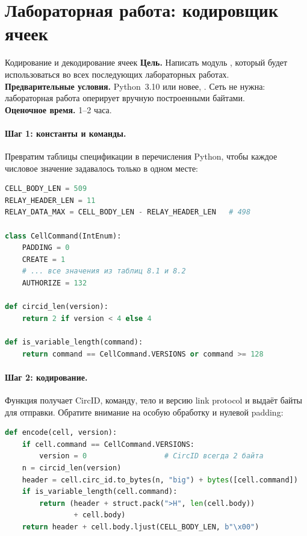 \section{Лабораторная работа: кодировщик ячеек}\label{sec:lab-celle}

\begin{laboratorio}[2]{Кодирование и декодирование ячеек}
\textbf{Цель.} Написать модуль , который будет использоваться во всех последующих лабораторных работах.\\
\textbf{Предварительные условия.} Python~3.10 или новее, . Сеть не нужна: лабораторная работа оперирует вручную построенными байтами.\\
\textbf{Оценочное время.} 1--2 часа.
\end{laboratorio}

\paragraph{Шаг 1: константы и команды.} Превратим таблицы спецификации в перечисления Python, чтобы каждое числовое значение задавалось только в одном месте:

\begin{lstlisting}[language=Python]
CELL_BODY_LEN = 509
RELAY_HEADER_LEN = 11
RELAY_DATA_MAX = CELL_BODY_LEN - RELAY_HEADER_LEN   # 498

class CellCommand(IntEnum):
    PADDING = 0
    CREATE = 1
    # ... все значения из таблиц 8.1 и 8.2
    AUTHORIZE = 132

def circid_len(version):
    return 2 if version < 4 else 4

def is_variable_length(command):
    return command == CellCommand.VERSIONS or command >= 128
\end{lstlisting}

\paragraph{Шаг 2: кодирование.} Функция получает CircID, команду, тело и версию link protocol и выдаёт байты для отправки. Обратите внимание на особую обработку  и нулевой padding:

\begin{lstlisting}[language=Python]
def encode(cell, version):
    if cell.command == CellCommand.VERSIONS:
        version = 0                  # CircID всегда 2 байта
    n = circid_len(version)
    header = cell.circ_id.to_bytes(n, "big") + bytes([cell.command])
    if is_variable_length(cell.command):
        return (header + struct.pack(">H", len(cell.body))
                + cell.body)
    return header + cell.body.ljust(CELL_BODY_LEN, b"\x00")
\end{lstlisting}

